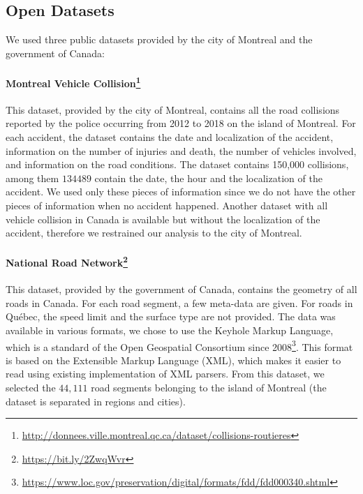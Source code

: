 \documentclass[conference]{IEEEtran}
\begin{document}
\subsection{Open Datasets}
\label{sec:datasets}

We used three public datasets provided by the city of Montreal and the government of Canada: 

\paragraph{Montreal Vehicle Collision\protect\footnote{\url{http://donnees.ville.montreal.qc.ca/dataset/collisions-routieres}}}

This dataset, provided by the city of Montreal, contains all the road
collisions reported by the police occurring from 2012 to 2018 on the island
of Montreal. For each accident, the dataset contains the date and
localization of the accident, information on the number of injuries and
death, the number of vehicles involved, and information on the road
conditions. The dataset contains 150,000 collisions, among them $134 489$
contain the date, the hour and the localization of the accident. We used
only these pieces of information since we do not have the other pieces
of information when no accident happened.
Another dataset with all vehicle collision in Canada is available but
without the localization of the accident, therefore we restrained our
analysis to the city of Montreal.

\paragraph{National Road Network\protect\footnote{\url{https://bit.ly/2ZwqWvr}}}

This dataset, provided by the government of Canada, contains the geometry of
all roads in Canada. For each road segment, a few meta-data are given. For
roads in Québec, the speed limit and the surface type are not provided. The
data was available in various formats, we chose to use the Keyhole Markup
Language, which is a standard of the Open Geospatial Consortium since 2008\protect\footnote{\url{https://www.loc.gov/preservation/digital/formats/fdd/fdd000340.shtml}}. 
This format is based on the Extensible Markup Language (XML), which makes it
easier to read using existing implementation of XML parsers. From this
dataset, we selected the $44,111$ road segments belonging to the island of
Montreal (the dataset is separated in regions and cities).
\end{document}
